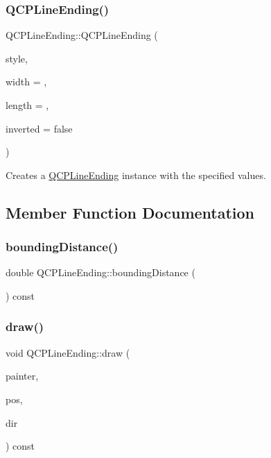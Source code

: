 \subsubsection{\texorpdfstring{Q\+C\+P\+Line\+Ending()}{QCPLineEnding()}\hspace{0.1cm}{\footnotesize\ttfamily [2/2]}}
{\footnotesize\ttfamily Q\+C\+P\+Line\+Ending\+::\+Q\+C\+P\+Line\+Ending (\begin{DoxyParamCaption}\item[{\hyperlink{class_q_c_p_line_ending_a5ef16e6876b4b74959c7261d8d4c2cd5}{Q\+C\+P\+Line\+Ending\+::\+Ending\+Style}}]{style,  }\item[{double}]{width = {},  }\item[{double}]{length = {},  }\item[{bool}]{inverted = {\ttfamily false} }\end{DoxyParamCaption})}

Creates a \hyperlink{class_q_c_p_line_ending}{Q\+C\+P\+Line\+Ending} instance with the specified values. 

\subsection{Member Function Documentation}
\mbox{\label{class_q_c_p_line_ending_a14fe390ddd590864ac66a60ed5278df5}} 
\subsubsection{\texorpdfstring{bounding\+Distance()}{boundingDistance()}}
{\footnotesize\ttfamily double Q\+C\+P\+Line\+Ending\+::bounding\+Distance (\begin{DoxyParamCaption}{ }\end{DoxyParamCaption}) const}

\mbox{\label{class_q_c_p_line_ending_a4f45db54f2aba03acf055e29aec1e8e7}} 
\subsubsection{\texorpdfstring{draw()}{draw()}\hspace{0.1cm}{\footnotesize\ttfamily [1/2]}}
{\footnotesize\ttfamily void Q\+C\+P\+Line\+Ending\+::draw (\begin{DoxyParamCaption}\item[{\hyperlink{class_q_c_p_painter}{Q\+C\+P\+Painter} $\ast$}]{painter,  }\item[{const \hyperlink{class_q_c_p_vector2_d}{Q\+C\+P\+Vector2D} \&}]{pos,  }\item[{const \hyperlink{class_q_c_p_vector2_d}{Q\+C\+P\+Vector2D} \&}]{dir }\end{DoxyParamCaption}) const}


